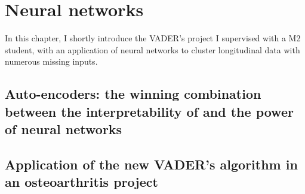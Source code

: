 \chapter{Neural networks}

In this chapter, I shortly introduce the VADER's project I supervised with a M2 student, with an application of neural networks to cluster longitudinal data with numerous missing inputs. 

\section{Auto-encoders: the winning combination between the interpretability of  and the power of neural networks}

\section{Application of the new VADER's algorithm in an osteoarthritis project}